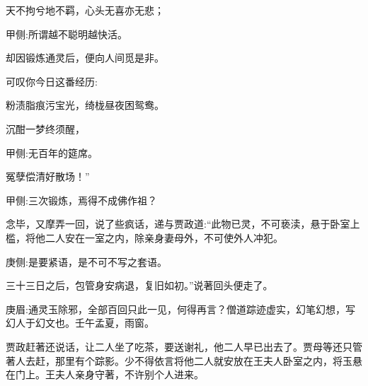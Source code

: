 \begin{poem}
    \begin{pl}   天不拘兮地不羁，心头无喜亦无悲；\end{pl}
    \begin{note}甲侧:所谓越不聪明越快活。\end{note}

    \begin{pl}   却因锻炼通灵后，便向人间觅是非。\end{pl}
\end{poem}


\begin{parag}
    可叹你今日这番经历:
\end{parag}


\begin{poem}
    \begin{pl} 粉渍脂痕污宝光，绮栊昼夜困鸳鸯。\end{pl}

    \begin{pl} 沉酣一梦终须醒，\end{pl}\begin{note}甲侧:无百年的筵席。\end{note}\begin{pl}冤孽偿清好散场！”\end{pl}\begin{note}甲侧:三次锻炼，焉得不成佛作祖？\end{note}
\end{poem}


\begin{parag}
    念毕，又摩弄一回，说了些疯话，递与贾政道:“此物已灵，不可亵渎，悬于卧室上槛，将他二人安在一室之内，除亲身妻母外，不可使外人冲犯。\begin{note}庚侧:是要紧语，是不可不写之套语。\end{note}三十三日之后，包管身安病退，复旧如初。”说著回头便走了。\begin{note}庚眉:通灵玉除邪，全部百回只此一见，何得再言？僧道踪迹虚实，幻笔幻想，写幻人于幻文也。壬午孟夏，雨窗。\end{note}贾政赶著还说话，让二人坐了吃茶，要送谢礼，他二人早已出去了。贾母等还只管著人去赶，那里有个踪影。少不得依言将他二人就安放在王夫人卧室之内，将玉悬在门上。王夫人亲身守著，不许别个人进来。
\end{parag}


